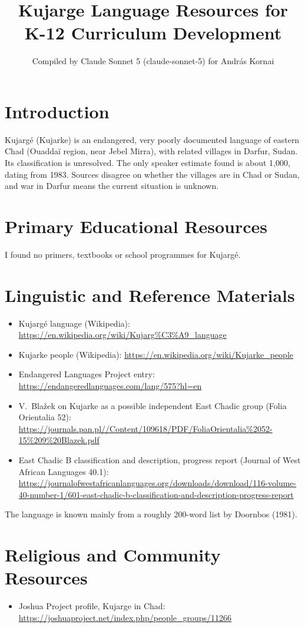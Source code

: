 \documentclass[12pt]{article}
\title{Kujarge Language Resources for K-12 Curriculum Development}
\author{Compiled by Claude Sonnet 5 (claude-sonnet-5) for Andr\'as Kornai}
\date{}
\begin{document}
\maketitle

\section{Introduction}
Kujarg\'e (Kujarke) is an endangered, very poorly documented language of eastern Chad (Ouadda\"i region, near Jebel Mirra), with related villages in Darfur, Sudan. Its classification is unresolved. The only speaker estimate found is about 1,000, dating from 1983. Sources disagree on whether the villages are in Chad or Sudan, and war in Darfur means the current situation is unknown.

\section{Primary Educational Resources}
I found no primers, textbooks or school programmes for Kujarg\'e.

\section{Linguistic and Reference Materials}
\begin{itemize}
\item Kujarg\'e language (Wikipedia): \url{https://en.wikipedia.org/wiki/Kujarg%C3%A9_language}
\item Kujarke people (Wikipedia): \url{https://en.wikipedia.org/wiki/Kujarke_people}
\item Endangered Languages Project entry: \url{https://endangeredlanguages.com/lang/575?hl=en}
\item V.\ Bla\v{z}ek on Kujarke as a possible independent East Chadic group (Folia Orientalia 52): \url{https://journals.pan.pl//Content/109618/PDF/FoliaOrientalia%2052-15%209%20Blazek.pdf}
\item East Chadic B classification and description, progress report (Journal of West African Languages 40.1): \url{https://journalofwestafricanlanguages.org/downloads/download/116-volume-40-number-1/601-east-chadic-b-classification-and-description-progress-report}
\end{itemize}
The language is known mainly from a roughly 200-word list by Doornbos (1981).

\section{Religious and Community Resources}
\begin{itemize}
\item Joshua Project profile, Kujarge in Chad: \url{https://joshuaproject.net/index.php/people_groups/11266}
\end{itemize}
\end{document}
